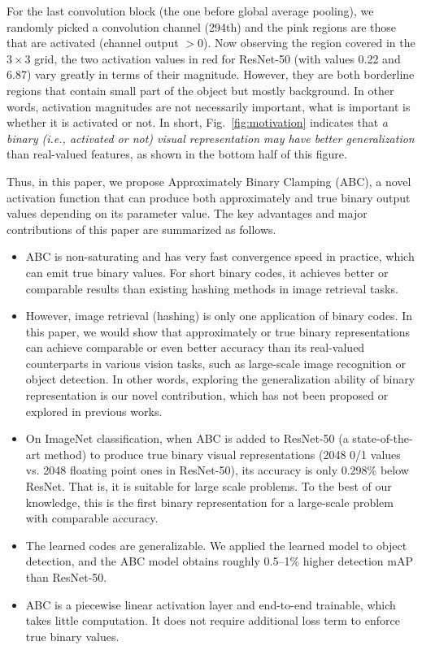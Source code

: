 \documentclass[runningheads]{llncs}
\newcommand{\ie}{\textit{i}.\textit{e}.}
\begin{document}
For the last convolution block (the one before global average pooling), we randomly picked a convolution channel (294th) and the pink regions are those that are activated (channel output $>0$). Now observing the region covered in the $3 \times 3$ grid, the two activation values in red for ResNet-50 (with values 0.22 and 6.87) vary greatly in terms of their magnitude. However, they are both borderline regions that contain small part of the object but mostly background. In other words, activation magnitudes are not necessarily important, what is important is whether it is activated or not. In short, Fig.~\ref{fig:motivation} indicates that \emph{a binary (\ie, activated or not) visual representation may have better generalization} than real-valued features, as shown in the bottom half of this figure.

Thus, in this paper, we propose Approximately Binary Clamping (ABC), a novel activation function that can produce both approximately and true binary output values depending on its parameter value. The key advantages and major contributions of this paper are summarized as follows.

\begin{itemize}
	\item ABC is non-saturating and has very fast convergence speed in practice, which can emit true binary values. For short binary codes, it achieves better or comparable results than existing hashing methods in image retrieval tasks.
	
	\item However, image retrieval (hashing) is only one application of binary codes. In this paper, we would show that approximately or true binary representations can achieve comparable or even better accuracy than its real-valued counterparts in various vision tasks, such as large-scale image recognition or object detection. In other words, exploring the generalization ability of binary representation is our novel contribution, which has not been proposed or explored in previous works.
	
	\item On ImageNet classification, when ABC is added to ResNet-50 (a state-of-the-art method) to produce true binary visual representations (2048 0/1 values vs. 2048 floating point ones in ResNet-50), its accuracy is only 0.298\% below ResNet. That is, it is suitable for large scale problems. To the best of our knowledge, this is the first binary representation for a large-scale problem with comparable accuracy.
	
	\item The learned codes are generalizable. We applied the learned model to object detection, and the ABC model obtains roughly 0.5--1\% higher detection mAP than ResNet-50.
	
	\item ABC is a piecewise linear activation layer and end-to-end trainable, which takes little computation. It does not require additional loss term to enforce true binary values.
\end{itemize}
\end{document}

